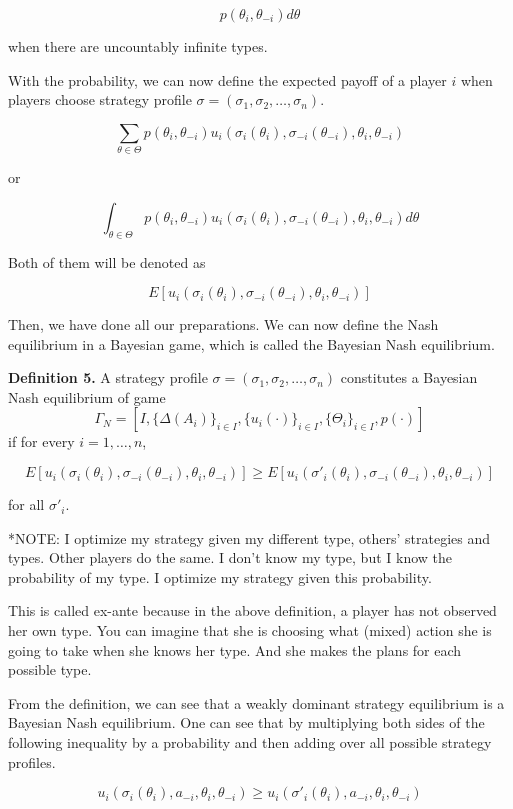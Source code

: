 \documentclass[12pt, oneside]{article}
\begin{document}
\[
p(\theta_i, \theta_{-i}) d\theta
\]

when there are uncountably infinite types.

With the probability, we can now define the expected payoff of a player \( i \) when players choose strategy profile \( \sigma = (\sigma_1, \sigma_2, \dots, \sigma_n) \).

\[
\sum_{\theta \in \Theta} p(\theta_i, \theta_{-i}) u_i(\sigma_i(\theta_i), \sigma_{-i}(\theta_{-i}), \theta_i, \theta_{-i})
\]

or

\[
\int_{\theta \in \Theta} p(\theta_i, \theta_{-i}) u_i(\sigma_i(\theta_i), \sigma_{-i}(\theta_{-i}), \theta_i, \theta_{-i}) d\theta
\]

Both of them will be denoted as

\[
E[u_i(\sigma_i(\theta_i), \sigma_{-i}(\theta_{-i}), \theta_i, \theta_{-i})]
\]

Then, we have done all our preparations. We can now define the Nash equilibrium in a Bayesian game, which is called the Bayesian Nash equilibrium.

\textbf{Definition 5.} A strategy profile \( \sigma = (\sigma_1, \sigma_2, \dots, \sigma_n) \) constitutes a Bayesian Nash equilibrium of game
\[
\Gamma_N = [I, \{\Delta(A_i)\}_{i\in I}, \{u_i(\cdot)\}_{i\in I}, \{\Theta_i\}_{i\in I}, p(\cdot)]
\]
if for every \( i = 1, \dots, n \),

\[
E[u_i(\sigma_i(\theta_i), \sigma_{-i}(\theta_{-i}), \theta_i, \theta_{-i})] \geq E[u_i(\sigma'_i(\theta_i), \sigma_{-i}(\theta_{-i}), \theta_i, \theta_{-i})]
\]

for all \( \sigma'_i \).

*NOTE: I optimize my strategy given my different type, others' strategies and types. Other players do the same. I don't know my type, but I know the probability of my type. I optimize my strategy given this probability.

This is called ex-ante because in the above definition, a player has not observed her own type. You can imagine that she is choosing what (mixed) action she is going to take when she knows her type. And she makes the plans for each possible type.

From the definition, we can see that a weakly dominant strategy equilibrium is a Bayesian Nash equilibrium. One can see that by multiplying both sides of the following inequality by a probability and then adding over all possible strategy profiles.

\[
u_i(\sigma_i(\theta_i), a_{-i}, \theta_i, \theta_{-i}) \geq u_i(\sigma'_i(\theta_i), a_{-i}, \theta_i, \theta_{-i})
\]
\end{document}
